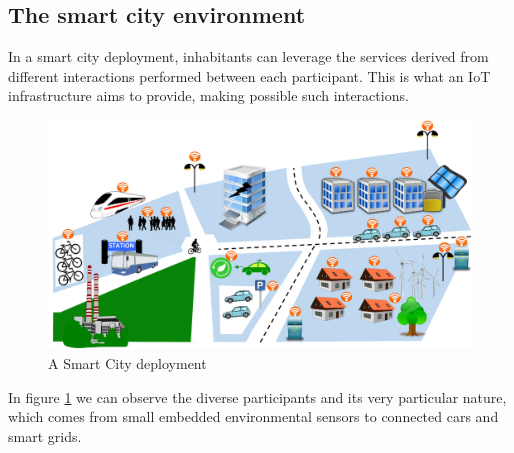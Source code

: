 \subsection{The smart city environment}
\label{sec:SmartCityEnv}
In a smart city deployment\cite{smartsantander}, inhabitants can leverage the services derived from different interactions performed between each participant.
This is what an IoT infrastructure aims to provide, making possible such interactions.

\begin{figure}[htb]
	\centering
	\includegraphics[width=1\columnwidth]{chapters/background.images/SmartCity_comm.pdf}
	\caption{A Smart City deployment}
	\label{fig:SmartCity}
\end{figure}

In figure \ref{fig:SmartCity} we can observe the diverse participants and its very particular nature, which comes from small embedded environmental sensors to connected cars and smart grids.

